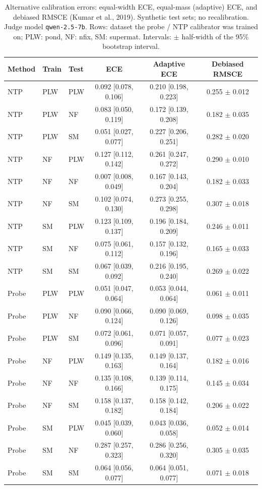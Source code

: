 \begin{table}[t]
\centering
\small
\caption{Alternative calibration errors: equal-width ECE, equal-mass (adaptive) ECE, and debiased RMSCE (Kumar et al., 2019). Synthetic test sets; no recalibration. Judge model \texttt{qwen-2.5-7b}. Rows: dataset the probe / NTP calibrator was trained on; PLW: pond, NF: nfix, SM: supermat. Intervals: $\pm$ half-width of the 95\% bootstrap interval.}
\label{tab:calibration-syn-ece-variants}
\begin{tabular}{lllccc}
\toprule
Method & Train & Test & ECE & Adaptive ECE & Debiased RMSCE \\
\midrule
NTP & PLW & PLW & 0.092 [0.078, 0.106] & 0.210 [0.198, 0.223] & 0.255 $\pm$ 0.012 \\
NTP & PLW & NF & 0.083 [0.050, 0.119] & 0.172 [0.139, 0.208] & 0.182 $\pm$ 0.035 \\
NTP & PLW & SM & 0.051 [0.027, 0.077] & 0.227 [0.206, 0.251] & 0.282 $\pm$ 0.020 \\
NTP & NF & PLW & 0.127 [0.112, 0.142] & 0.261 [0.247, 0.272] & 0.290 $\pm$ 0.010 \\
NTP & NF & NF & 0.007 [0.008, 0.049] & 0.167 [0.143, 0.204] & 0.182 $\pm$ 0.033 \\
NTP & NF & SM & 0.102 [0.074, 0.130] & 0.273 [0.255, 0.298] & 0.307 $\pm$ 0.018 \\
NTP & SM & PLW & 0.123 [0.109, 0.137] & 0.196 [0.184, 0.209] & 0.246 $\pm$ 0.011 \\
NTP & SM & NF & 0.075 [0.061, 0.112] & 0.157 [0.132, 0.196] & 0.165 $\pm$ 0.033 \\
NTP & SM & SM & 0.067 [0.039, 0.092] & 0.216 [0.195, 0.240] & 0.269 $\pm$ 0.022 \\
\midrule
Probe & PLW & PLW & 0.051 [0.047, 0.064] & 0.053 [0.044, 0.064] & 0.061 $\pm$ 0.011 \\
Probe & PLW & NF & 0.090 [0.066, 0.124] & 0.090 [0.069, 0.126] & 0.098 $\pm$ 0.035 \\
Probe & PLW & SM & 0.072 [0.061, 0.096] & 0.071 [0.057, 0.091] & 0.077 $\pm$ 0.023 \\
Probe & NF & PLW & 0.149 [0.135, 0.163] & 0.149 [0.137, 0.164] & 0.182 $\pm$ 0.016 \\
Probe & NF & NF & 0.135 [0.108, 0.166] & 0.139 [0.114, 0.175] & 0.145 $\pm$ 0.034 \\
Probe & NF & SM & 0.158 [0.137, 0.182] & 0.158 [0.142, 0.184] & 0.206 $\pm$ 0.022 \\
Probe & SM & PLW & 0.045 [0.039, 0.060] & 0.043 [0.036, 0.058] & 0.052 $\pm$ 0.014 \\
Probe & SM & NF & 0.287 [0.257, 0.323] & 0.286 [0.256, 0.320] & 0.305 $\pm$ 0.035 \\
Probe & SM & SM & 0.064 [0.056, 0.077] & 0.064 [0.051, 0.077] & 0.071 $\pm$ 0.018 \\
\bottomrule
\end{tabular}
\end{table}
